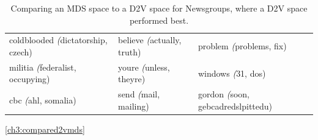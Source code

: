 \begin{table}[]
\begin{tabular}{lll}
		coldblooded \textit({dictatorship, czech)}      & believe \textit({actually, truth)}        & problem \textit({problems, fix)}                    \\
		militia \textit({federalist, occupying)}        & youre \textit({unless, theyre)}           & windows \textit({31, dos)}                          \\
		cbc \textit({ahl, somalia)}                     & send \textit({mail, mailing)}             & gordon \textit({soon, gebcadredslpittedu)}         
	\end{tabular}
	\caption{Comparing an MDS space to a D2V space for Newsgroups, where a D2V space performed best.}\ref{ch3:compared2vmds}
\end{table}







